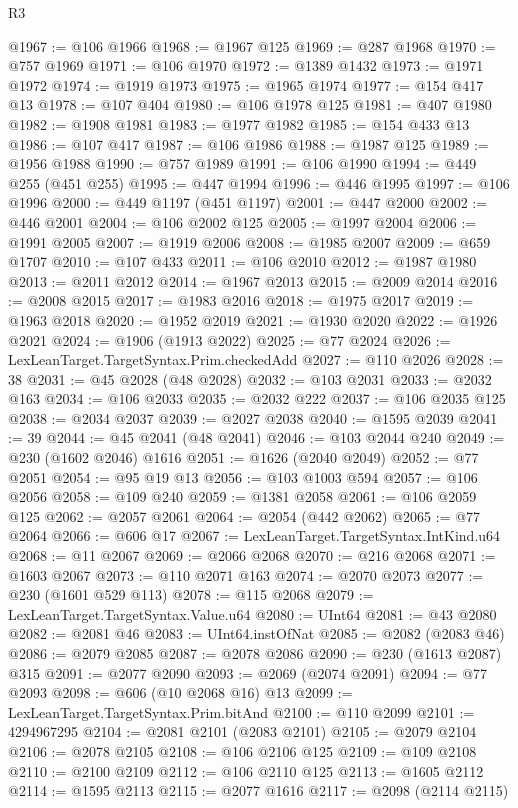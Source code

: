 \begin{lexlean}{R3}
\begin{coremodule}
@1967 := @106 @1966
@1968 := @1967 @125
@1969 := @287 @1968
@1970 := @757 @1969
@1971 := @106 @1970
@1972 := @1389 @1432
@1973 := @1971 @1972
@1974 := @1919 @1973
@1975 := @1965 @1974
@1977 := @154 @417 @13
@1978 := @107 @404
@1980 := @106 @1978 @125
@1981 := @407 @1980
@1982 := @1908 @1981
@1983 := @1977 @1982
@1985 := @154 @433 @13
@1986 := @107 @417
@1987 := @106 @1986
@1988 := @1987 @125
@1989 := @1956 @1988
@1990 := @757 @1989
@1991 := @106 @1990
@1994 := @449 @255 (@451 @255)
@1995 := @447 @1994
@1996 := @446 @1995
@1997 := @106 @1996
@2000 := @449 @1197 (@451 @1197)
@2001 := @447 @2000
@2002 := @446 @2001
@2004 := @106 @2002 @125
@2005 := @1997 @2004
@2006 := @1991 @2005
@2007 := @1919 @2006
@2008 := @1985 @2007
@2009 := @659 @1707
@2010 := @107 @433
@2011 := @106 @2010
@2012 := @1987 @1980
@2013 := @2011 @2012
@2014 := @1967 @2013
@2015 := @2009 @2014
@2016 := @2008 @2015
@2017 := @1983 @2016
@2018 := @1975 @2017
@2019 := @1963 @2018
@2020 := @1952 @2019
@2021 := @1930 @2020
@2022 := @1926 @2021
@2024 := @1906 (@1913 @2022)
@2025 := @77 @2024
@2026 := LexLeanTarget.TargetSyntax.Prim.checkedAdd
@2027 := @110 @2026
@2028 := 38
@2031 := @45 @2028 (@48 @2028)
@2032 := @103 @2031
@2033 := @2032 @163
@2034 := @106 @2033
@2035 := @2032 @222
@2037 := @106 @2035 @125
@2038 := @2034 @2037
@2039 := @2027 @2038
@2040 := @1595 @2039
@2041 := 39
@2044 := @45 @2041 (@48 @2041)
@2046 := @103 @2044 @240
@2049 := @230 (@1602 @2046) @1616
@2051 := @1626 (@2040 @2049)
@2052 := @77 @2051
@2054 := @95 @19 @13
@2056 := @103 @1003 @594
@2057 := @106 @2056
@2058 := @109 @240
@2059 := @1381 @2058
@2061 := @106 @2059 @125
@2062 := @2057 @2061
@2064 := @2054 (@442 @2062)
@2065 := @77 @2064
@2066 := @606 @17
@2067 := LexLeanTarget.TargetSyntax.IntKind.u64
@2068 := @11 @2067
@2069 := @2066 @2068
@2070 := @216 @2068
@2071 := @1603 @2067
@2073 := @110 @2071 @163
@2074 := @2070 @2073
@2077 := @230 (@1601 @529 @113)
@2078 := @115 @2068
@2079 := LexLeanTarget.TargetSyntax.Value.u64
@2080 := UInt64
@2081 := @43 @2080
@2082 := @2081 @46
@2083 := UInt64.instOfNat
@2085 := @2082 (@2083 @46)
@2086 := @2079 @2085
@2087 := @2078 @2086
@2090 := @230 (@1613 @2087) @315
@2091 := @2077 @2090
@2093 := @2069 (@2074 @2091)
@2094 := @77 @2093
@2098 := @606 (@10 @2068 @16) @13
@2099 := LexLeanTarget.TargetSyntax.Prim.bitAnd
@2100 := @110 @2099
@2101 := 4294967295
@2104 := @2081 @2101 (@2083 @2101)
@2105 := @2079 @2104
@2106 := @2078 @2105
@2108 := @106 @2106 @125
@2109 := @109 @2108
@2110 := @2100 @2109
@2112 := @106 @2110 @125
@2113 := @1605 @2112
@2114 := @1595 @2113
@2115 := @2077 @1616
@2117 := @2098 (@2114 @2115)

\end{coremodule}
\end{lexlean}
